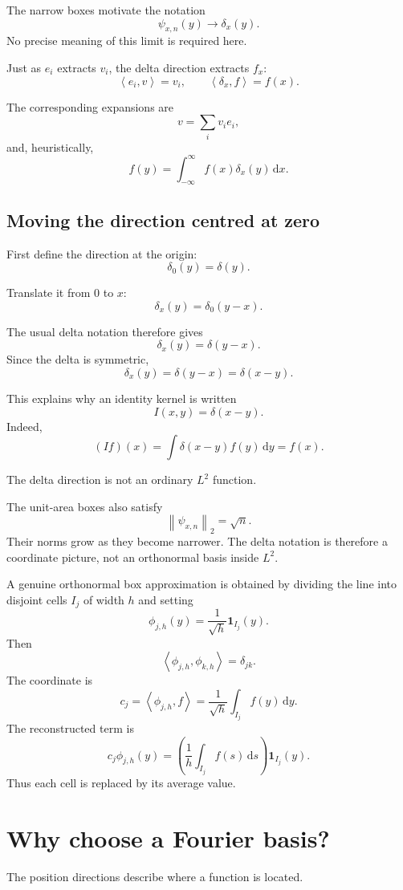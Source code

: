 \documentclass[11pt,a5paper,oneside,openany]{scrreprt}
\theoremstyle{notes}
\theoremstyle{definitions}
\newcommand{\ip}[2]{\left\langle #1,#2\right\rangle}
\newcommand{\norm}[1]{\left\lVert #1\right\rVert}
\newcommand{\dd}{\,\mathrm{d}}
\newcommand{\one}{\mathbf{1}}
\begin{document}
The narrow boxes motivate the notation
\[
 \psi_{x,n}(y)\longrightarrow\delta_x(y).
\]
No precise meaning of this limit is required here.

Just as $e_i$ extracts $v_i$, the delta direction extracts $f_x$:
\[
 \ip{e_i}{v}=v_i,
 \qquad
 \ip{\delta_x}{f}=f(x).
\]

The corresponding expansions are
\[
 v=\sum_i v_i e_i,
\]
and, heuristically,
\[
 \boxed{f(y)=\int_{-\infty}^{\infty}f(x)\delta_x(y)\dd x.}
\]

\subsection*{Moving the direction centred at zero}

First define the direction at the origin:
\[
 \delta_0(y)=\delta(y).
\]

Translate it from $0$ to $x$:
\[
 \boxed{\delta_x(y)=\delta_0(y-x).}
\]

The usual delta notation therefore gives
\[
 \delta_x(y)=\delta(y-x).
\]
Since the delta is symmetric,
\[
 \boxed{\delta_x(y)=\delta(y-x)=\delta(x-y).}
\]

This explains why an identity kernel is written
\[
 I(x,y)=\delta(x-y).
\]
Indeed,
\[
 (If)(x)=\int\delta(x-y)f(y)\dd y=f(x).
\]

\begin{caution}
The delta direction is not an ordinary $L^2$ function.

The unit-area boxes also satisfy
\[
 \norm{\psi_{x,n}}_2=\sqrt n.
\]
Their norms grow as they become narrower.  The delta notation is therefore
a coordinate picture, not an orthonormal basis inside $L^2$.
\end{caution}

A genuine orthonormal box approximation is obtained by dividing the line
into disjoint cells $I_j$ of width $h$ and setting
\[
 \phi_{j,h}(y)=\frac1{\sqrt h}\one_{I_j}(y).
\]
Then
\[
 \ip{\phi_{j,h}}{\phi_{k,h}}=\delta_{jk}.
\]
The coordinate is
\[
 c_j=\ip{\phi_{j,h}}{f}
 =\frac1{\sqrt h}\int_{I_j}f(y)\dd y.
\]
The reconstructed term is
\[
 c_j\phi_{j,h}(y)
 =\left(\frac1h\int_{I_j}f(s)\dd s\right)\one_{I_j}(y).
\]
Thus each cell is replaced by its average value.

\section{Why choose a Fourier basis?}

The position directions describe where a function is located.
\end{document}
